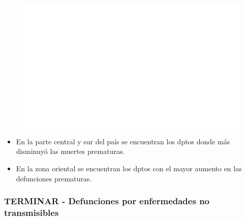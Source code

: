     \begin{figure}[H]
        \caption[Defunciones prematuras por departamento - Cambio porcentual entre 2010 y 2020 ]{\label{defprem_dpto_map_change} }
        \begin{center}
        \includegraphics[width=\textwidth,keepaspectratio]{img/var_280_map_change.png}
        \end{center}
    \end{figure}
            \begin{itemize}
                \item En la parte central y sur del país se encuentran los dptos donde más disminuyó las muertes prematuras.
                \item En la zona oriental se encuentran los dptos con el mayor aumento en las defunciones prematuras.
                \end{itemize}

        \subsubsection{TERMINAR - Defunciones por enfermedades no transmisibles}

